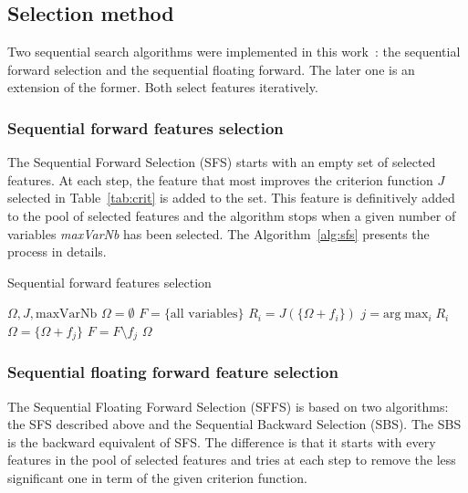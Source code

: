 \documentclass[journal]{IEEEtran}
\begin{document}
        \subsection{Selection method}
        \label{sec:selection:method}
        Two  sequential  search  algorithms were  implemented  in  this
        work~\cite{Guyon:2006:FEF:1208773}:  the   sequential  forward
        selection and the sequential  floating forward.  The later one
        is  an   extension  of   the  former.  Both   select  features
        iteratively.

        \subsubsection{Sequential forward features selection}
        \label{sec:forward-presentation}

        The Sequential Forward Selection (SFS) starts with an empty set of selected features.  At each  step, the feature that most  improves the criterion function $J$ selected in Table~\ref{tab:crit} is added  to the set. This feature is definitively added to the pool of selected features and the algorithm stops when a given number of variables \emph{maxVarNb} has been selected. The Algorithm~\ref{alg:sfs} presents the process in details.

        \begin{algorithm}
        \caption{Sequential forward features selection\label{alg:sfs}}
        {\footnotesize
        \begin{algorithmic}[1]
        \REQUIRE $\Omega,J,\text{maxVarNb}$
        \STATE $\Omega=\emptyset$
        \STATE $F=\text{\{all variables\}}$
        \STATE $R_i = J(\{\Omega + f_i\})$
        \ENDFOR
        \STATE $j=\text{arg} \max_{i} R_i$
        \STATE $\Omega = \{\Omega + f_j\}$
        \STATE $F = F \setminus f_j$
        \ENDWHILE
        \RETURN $\Omega$
        \end{algorithmic}
        }
        \end{algorithm}

        \subsubsection{Sequential floating forward feature selection}
        \label{sec:floating-presentation}

        The Sequential Floating Forward Selection (SFFS)\cite{somol1999adaptive} is based on two algorithms: the SFS described above and the Sequential Backward Selection (SBS). The SBS is the backward equivalent of SFS. The difference is that it starts with every features in the pool of selected features and tries at each step to remove the less significant one in term of the given criterion function.
\end{document}

